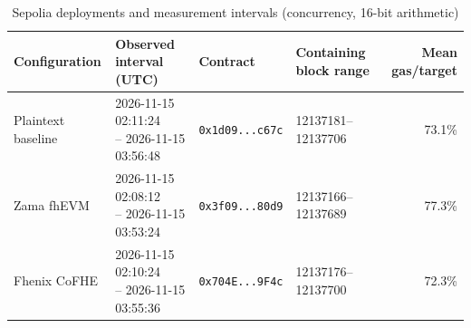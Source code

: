 \begin{table}[!t]
\caption{Sepolia deployments and measurement intervals (concurrency, 16-bit arithmetic)}
\label{tab:sepolia-concurrency-deployments}
\centering
\footnotesize
\setlength{\tabcolsep}{4pt}
\begin{tabular}{|l|l|l|l|r|}
\hline
\textbf{Configuration} & \textbf{Observed interval (UTC)} & \textbf{Contract} & \textbf{Containing block range} & \textbf{Mean gas/target} \\
\hline
Plaintext baseline & \shortstack[l]{2026-11-15 02:11:24 \\ -- 2026-11-15 03:56:48} & \texttt{0x1d09...c67c} & 12137181--12137706 & 73.1\% \\
\hline
Zama fhEVM & \shortstack[l]{2026-11-15 02:08:12 \\ -- 2026-11-15 03:53:24} & \texttt{0x3f09...80d9} & 12137166--12137689 & 77.3\% \\
\hline
Fhenix CoFHE & \shortstack[l]{2026-11-15 02:10:24 \\ -- 2026-11-15 03:55:36} & \texttt{0x704E...9F4c} & 12137176--12137700 & 72.3\% \\
\hline
\end{tabular}
\end{table}
